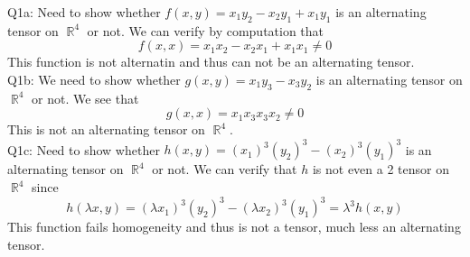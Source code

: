 \documentclass[letterpaper]{article}
\DeclareMathOperator{\R}{\mathbb{R}}
\begin{document}
\noindent Q1a: Need to show whether $f(x,y)= x_1y_2-x_2y_1+x_1y_1$ is an alternating tensor on $\R^4$ or not. We can verify by computation that $$f(x,x) = x_1x_2 -x_2x_1 + x_1x_1\neq 0$$ This function is not alternatin and thus can not be an alternating tensor. 
\newline \\ Q1b: We need to show whether $g(x,y) = x_1y_3-x_3y_2$ is an alternating tensor on $\R^4$ or not. We see that $$g(x,x) = x_1x_3x_3x_2\neq 0$$ This is not an alternating tensor on $\R^4$. 
\newline \\ Q1c: Need to show whether $h(x,y)= (x_1)^3(y_2)^3 - (x_2)^3(y_1)^3$ is an alternating tensor on $\R^4$ or not. We can verify that $h$ is not even a 2 tensor on $\R^4$ since $$h(\lambda x,y) = (\lambda x_1)^3(y_2)^3 - (\lambda x_2 )^3(y_1)^3 = \lambda ^3 h(x,y)$$ This function fails homogeneity and thus is not a tensor, much less an alternating tensor. 
\end{document}
